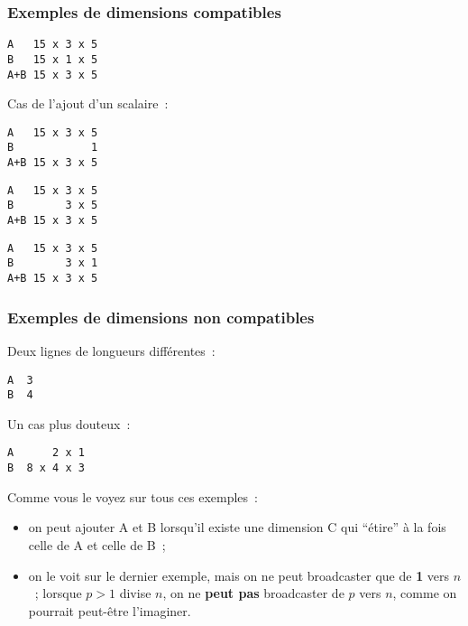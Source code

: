     \hypertarget{exemples-de-dimensions-compatibles}{%
\subsubsection{Exemples de dimensions
compatibles}\label{exemples-de-dimensions-compatibles}}

    \begin{verbatim}
A   15 x 3 x 5
B   15 x 1 x 5
A+B 15 x 3 x 5
\end{verbatim}

    Cas de l'ajout d'un scalaire~:

\begin{verbatim}
A   15 x 3 x 5
B            1
A+B 15 x 3 x 5
\end{verbatim}

    \begin{verbatim}
A   15 x 3 x 5
B        3 x 5
A+B 15 x 3 x 5
\end{verbatim}

    \begin{verbatim}
A   15 x 3 x 5
B        3 x 1
A+B 15 x 3 x 5
\end{verbatim}

    \hypertarget{exemples-de-dimensions-non-compatibles}{%
\subsubsection{\texorpdfstring{Exemples de dimensions \textbf{non
compatibles}}{Exemples de dimensions non compatibles}}\label{exemples-de-dimensions-non-compatibles}}

    Deux lignes de longueurs différentes~:

\begin{verbatim}
A  3
B  4
\end{verbatim}

    Un cas plus douteux~:

\begin{verbatim}
A      2 x 1
B  8 x 4 x 3
\end{verbatim}

    Comme vous le voyez sur tous ces exemples~:

\begin{itemize}
\item
  on peut ajouter A et B lorsqu'il existe une dimension C qui ``étire''
  à la fois celle de A et celle de B~;
\item
  on le voit sur le dernier exemple, mais on ne peut broadcaster que de
  \textbf{1} vers \(n\)~; lorsque \(p>1\) divise \(n\), on ne
  \textbf{peut pas} broadcaster de \(p\) vers \(n\), comme on pourrait
  peut-être l'imaginer.
\end{itemize}


